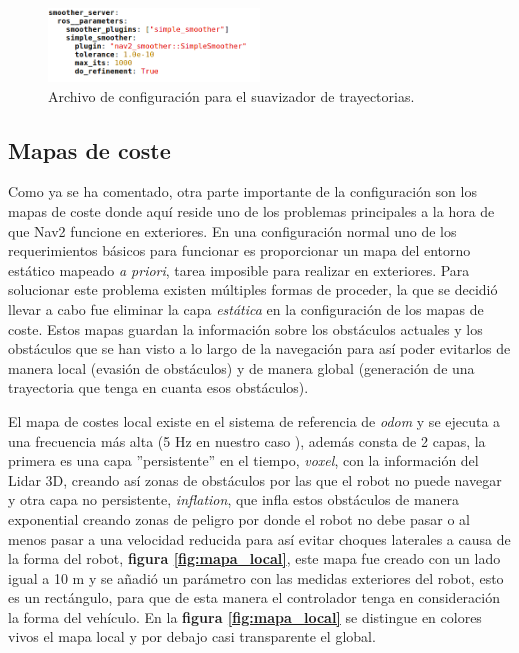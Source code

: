 \begin{figure}[H]
    \centering
    \includegraphics[width=0.5\textwidth]{images/smoother_configuracion.png}
    \caption{Archivo de configuración para el suavizador de trayectorias.}
    \label{fig:parametros_smoother_server}
\end{figure}

\subsection{Mapas de coste}
Como ya se ha comentado, otra parte importante de la configuración son los mapas de coste donde aquí reside uno de los problemas principales 
a la hora de que Nav2 funcione en exteriores. En una configuración normal uno de los requerimientos básicos para funcionar es proporcionar 
un mapa del entorno estático mapeado \textit{a priori}, tarea imposible para realizar en exteriores. Para solucionar este problema existen múltiples formas 
de proceder, la que se decidió llevar a cabo fue eliminar la capa \textit{estática} en la configuración de los mapas de coste. Estos mapas guardan la 
información sobre los obstáculos actuales y los obstáculos que se han visto a lo largo de la navegación para así poder evitarlos de manera local (evasión de obstáculos) y 
de manera global (generación de una trayectoria que tenga en cuanta esos obstáculos).

El mapa de costes local existe en el sistema de referencia de \textit{odom} y se ejecuta 
a una frecuencia más alta (5 Hz en nuestro caso ), además consta de 2 capas, la primera es una capa ''persistente'' en el tiempo, \textit{voxel}, con la información del Lidar 3D, creando así zonas de obstáculos por 
las que el robot no puede navegar y otra capa no persistente, \textit{inflation}, que infla estos obstáculos de manera exponential creando zonas 
de peligro por donde el robot no debe pasar o al menos pasar a una velocidad reducida para así evitar choques laterales a causa de la forma del robot, \textbf{figura \ref{fig:mapa_local}}, este 
mapa fue creado con un lado igual a 10 m y se añadió un parámetro con las medidas exteriores del robot, esto es un rectángulo, para que de esta manera el controlador tenga en consideración 
la forma del vehículo. En la \textbf{figura \ref{fig:mapa_local}} se distingue en colores vivos el mapa local y por debajo casi transparente el global.


